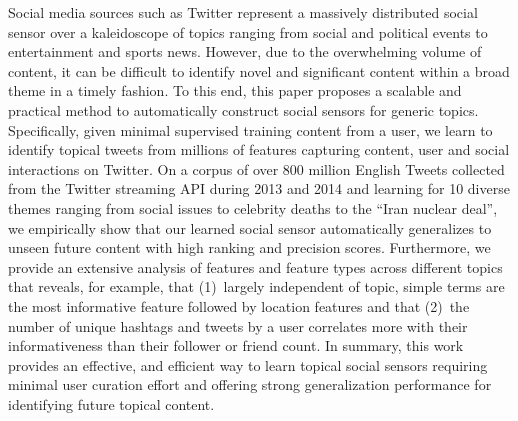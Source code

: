
Social media sources such as Twitter represent a massively distributed
social sensor over a kaleidoscope of topics ranging from social and
political events to entertainment and sports news.
However, due to the overwhelming volume of content, it can be
difficult to identify novel and significant content within a broad
theme in a timely fashion.
%
%
To this end, this paper proposes a scalable and practical method to
automatically construct social sensors for generic topics.
Specifically, given minimal supervised training content from a user, we learn 
to identify topical tweets 
from millions of features capturing content, user and social interactions on Twitter.
On a corpus of over 800 million English Tweets
collected from the Twitter
streaming API during 2013 and 2014 and learning for 10 diverse themes 
ranging from social issues to celebrity deaths to the ``Iran nuclear
deal'', we empirically show that our learned social sensor
automatically generalizes to unseen future content 
with high ranking and precision scores.  Furthermore, we provide an
extensive analysis of features and feature types across different
topics that reveals, for example, that (1)~largely independent of
topic, simple terms are the most informative feature followed by
location features and that (2)~the number of unique hashtags and
tweets by a user correlates more with their informativeness than their
follower or friend count.  In summary, this work provides an effective, and efficient way to learn topical social sensors requiring
minimal user curation effort and offering strong generalization performance
for identifying future topical content.

